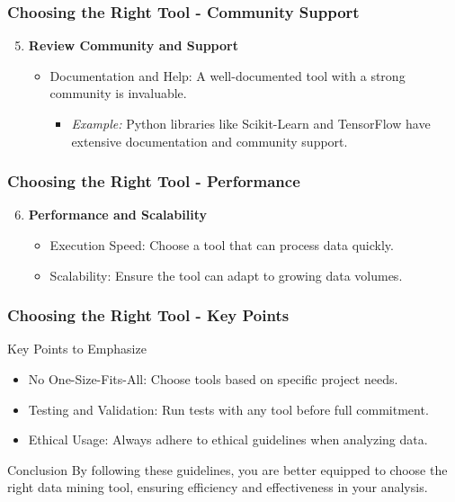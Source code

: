 \documentclass[aspectratio=169]{beamer}
\begin{document}
\begin{frame}[fragile]
    \frametitle{Choosing the Right Tool - Community Support}
    \begin{enumerate}
        \setcounter{enumi}{4}
        \item \textbf{Review Community and Support}
        \begin{itemize}
            \item Documentation and Help: A well-documented tool with a strong community is invaluable.
            \begin{itemize}
                \item \textit{Example:} Python libraries like Scikit-Learn and TensorFlow have extensive documentation and community support.
            \end{itemize}
        \end{itemize}
    \end{enumerate}
\end{frame}

\begin{frame}[fragile]
    \frametitle{Choosing the Right Tool - Performance}
    \begin{enumerate}
        \setcounter{enumi}{5}
        \item \textbf{Performance and Scalability}
        \begin{itemize}
            \item Execution Speed: Choose a tool that can process data quickly.
            \item Scalability: Ensure the tool can adapt to growing data volumes.
        \end{itemize}
    \end{enumerate}
\end{frame}

\begin{frame}[fragile]
    \frametitle{Choosing the Right Tool - Key Points}
    \begin{block}{Key Points to Emphasize}
        \begin{itemize}
            \item No One-Size-Fits-All: Choose tools based on specific project needs.
            \item Testing and Validation: Run tests with any tool before full commitment.
            \item Ethical Usage: Always adhere to ethical guidelines when analyzing data.
        \end{itemize}
    \end{block}
    
    \begin{block}{Conclusion}
        By following these guidelines, you are better equipped to choose the right data mining tool, ensuring efficiency and effectiveness in your analysis.
    \end{block}
\end{frame}
\end{document}
